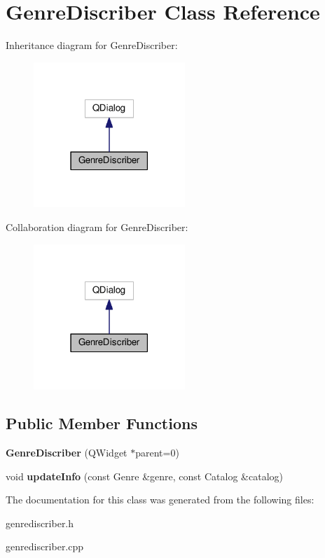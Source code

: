 \hypertarget{class_genre_discriber}{}\section{Genre\+Discriber Class Reference}
\label{class_genre_discriber}


Inheritance diagram for Genre\+Discriber\+:
\nopagebreak
\begin{figure}[H]
\begin{center}
\leavevmode
\includegraphics[width=162pt]{class_genre_discriber__inherit__graph}
\end{center}
\end{figure}


Collaboration diagram for Genre\+Discriber\+:
\nopagebreak
\begin{figure}[H]
\begin{center}
\leavevmode
\includegraphics[width=162pt]{class_genre_discriber__coll__graph}
\end{center}
\end{figure}
\subsection*{Public Member Functions}
\begin{DoxyCompactItemize}
\item 
{\bfseries Genre\+Discriber} (Q\+Widget $\ast$parent=0)\hypertarget{class_genre_discriber_aa5b6015fb71401f9b1e99102483b58f7}{}\label{class_genre_discriber_aa5b6015fb71401f9b1e99102483b58f7}

\item 
void {\bfseries update\+Info} (const Genre \&genre, const Catalog \&catalog)\hypertarget{class_genre_discriber_ab1e981c3fec2a53c80ec19ab2fd8f819}{}\label{class_genre_discriber_ab1e981c3fec2a53c80ec19ab2fd8f819}

\end{DoxyCompactItemize}


The documentation for this class was generated from the following files\+:\begin{DoxyCompactItemize}
\item 
genrediscriber.\+h\item 
genrediscriber.\+cpp\end{DoxyCompactItemize}
